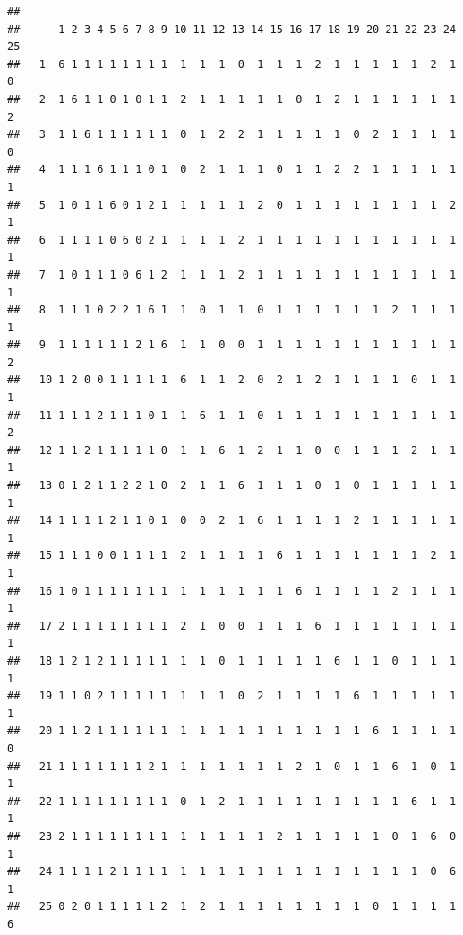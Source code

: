 \documentclass[
]{book}
\newenvironment{Shaded}{\begin{snugshade}}{\end{snugshade}}
\newcommand{\FloatTok}[1]{\textcolor[rgb]{0.00,0.00,0.81}{#1}}
\newcommand{\FunctionTok}[1]{\textcolor[rgb]{0.00,0.00,0.00}{#1}}
\newcommand{\NormalTok}[1]{#1}
\newcommand{\SpecialCharTok}[1]{\textcolor[rgb]{0.00,0.00,0.00}{#1}}
\begin{document}
\begin{verbatim}
##     
##      1 2 3 4 5 6 7 8 9 10 11 12 13 14 15 16 17 18 19 20 21 22 23 24 25
##   1  6 1 1 1 1 1 1 1 1  1  1  1  0  1  1  1  2  1  1  1  1  1  2  1  0
##   2  1 6 1 1 0 1 0 1 1  2  1  1  1  1  1  0  1  2  1  1  1  1  1  1  2
##   3  1 1 6 1 1 1 1 1 1  0  1  2  2  1  1  1  1  1  0  2  1  1  1  1  0
##   4  1 1 1 6 1 1 1 0 1  0  2  1  1  1  0  1  1  2  2  1  1  1  1  1  1
##   5  1 0 1 1 6 0 1 2 1  1  1  1  1  2  0  1  1  1  1  1  1  1  1  2  1
##   6  1 1 1 1 0 6 0 2 1  1  1  1  2  1  1  1  1  1  1  1  1  1  1  1  1
##   7  1 0 1 1 1 0 6 1 2  1  1  1  2  1  1  1  1  1  1  1  1  1  1  1  1
##   8  1 1 1 0 2 2 1 6 1  1  0  1  1  0  1  1  1  1  1  1  2  1  1  1  1
##   9  1 1 1 1 1 1 2 1 6  1  1  0  0  1  1  1  1  1  1  1  1  1  1  1  2
##   10 1 2 0 0 1 1 1 1 1  6  1  1  2  0  2  1  2  1  1  1  1  0  1  1  1
##   11 1 1 1 2 1 1 1 0 1  1  6  1  1  0  1  1  1  1  1  1  1  1  1  1  2
##   12 1 1 2 1 1 1 1 1 0  1  1  6  1  2  1  1  0  0  1  1  1  2  1  1  1
##   13 0 1 2 1 1 2 2 1 0  2  1  1  6  1  1  1  0  1  0  1  1  1  1  1  1
##   14 1 1 1 1 2 1 1 0 1  0  0  2  1  6  1  1  1  1  2  1  1  1  1  1  1
##   15 1 1 1 0 0 1 1 1 1  2  1  1  1  1  6  1  1  1  1  1  1  1  2  1  1
##   16 1 0 1 1 1 1 1 1 1  1  1  1  1  1  1  6  1  1  1  1  2  1  1  1  1
##   17 2 1 1 1 1 1 1 1 1  2  1  0  0  1  1  1  6  1  1  1  1  1  1  1  1
##   18 1 2 1 2 1 1 1 1 1  1  1  0  1  1  1  1  1  6  1  1  0  1  1  1  1
##   19 1 1 0 2 1 1 1 1 1  1  1  1  0  2  1  1  1  1  6  1  1  1  1  1  1
##   20 1 1 2 1 1 1 1 1 1  1  1  1  1  1  1  1  1  1  1  6  1  1  1  1  0
##   21 1 1 1 1 1 1 1 2 1  1  1  1  1  1  1  2  1  0  1  1  6  1  0  1  1
##   22 1 1 1 1 1 1 1 1 1  0  1  2  1  1  1  1  1  1  1  1  1  6  1  1  1
##   23 2 1 1 1 1 1 1 1 1  1  1  1  1  1  2  1  1  1  1  1  0  1  6  0  1
##   24 1 1 1 1 2 1 1 1 1  1  1  1  1  1  1  1  1  1  1  1  1  1  0  6  1
##   25 0 2 0 1 1 1 1 1 2  1  2  1  1  1  1  1  1  1  1  0  1  1  1  1  6
\end{verbatim}

\begin{Shaded}
\end{Shaded}
\end{document}
